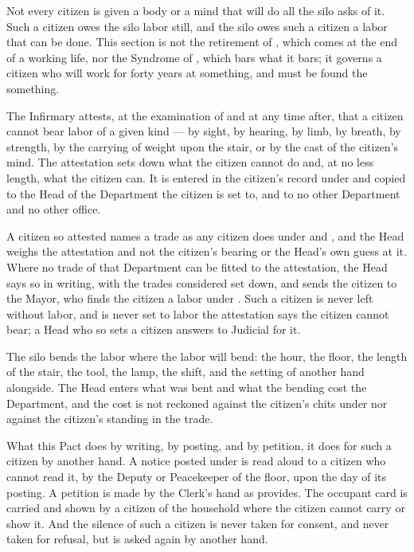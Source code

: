 Not every citizen is given a body or a mind that will do all the silo asks of it. Such a citizen owes the silo labor still, and the silo owes such a citizen a labor that can be done. This section is not the retirement of , which comes at the end of a working life, nor the Syndrome of , which bars what it bars; it governs a citizen who will work for forty years at something, and must be found the something.

\begin{clauses}
\item The Infirmary attests, at the examination of  and at any time after, that a citizen cannot bear labor of a given kind --- by sight, by hearing, by limb, by breath, by strength, by the carrying of weight upon the stair, or by the cast of the citizen's mind. The attestation sets down what the citizen cannot do and, at no less length, what the citizen can. It is entered in the citizen's record under  and copied to the Head of the Department the citizen is set to, and to no other Department and no other office.
\item A citizen so attested names a trade as any citizen does under  and , and the Head weighs the attestation and not the citizen's bearing or the Head's own guess at it. Where no trade of that Department can be fitted to the attestation, the Head says so in writing, with the trades considered set down, and sends the citizen to the Mayor, who finds the citizen a labor under . Such a citizen is never left without labor, and is never set to labor the attestation says the citizen cannot bear; a Head who so sets a citizen answers to Judicial for it.
\item The silo bends the labor where the labor will bend: the hour, the floor, the length of the stair, the tool, the lamp, the shift, and the setting of another hand alongside. The Head enters what was bent and what the bending cost the Department, and the cost is not reckoned against the citizen's chits under  nor against the citizen's standing in the trade.
\item What this Pact does by writing, by posting, and by petition, it does for such a citizen by another hand. A notice posted under  is read aloud to a citizen who cannot read it, by the Deputy or Peacekeeper of the floor, upon the day of its posting. A petition is made by the Clerk's hand as  provides. The occupant card is carried and shown by a citizen of the household where the citizen cannot carry or show it. And the silence of such a citizen is never taken for consent, and never taken for refusal, but is asked again by another hand.

\end{clauses}
